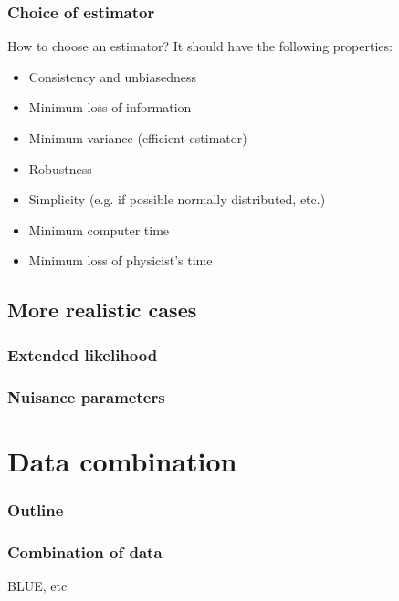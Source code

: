 \documentclass[9pt]{beamer}
\begin{document}
\begin{frame}
 \frametitle{Choice of estimator}
 How to choose an estimator? It should have the following properties:
 
 \begin{itemize}
  \item Consistency and unbiasedness
  \item Minimum loss of information
  \item Minimum variance (efficient estimator)
  \item Robustness
  \item Simplicity (e.g. if possible normally distributed, etc.)
  \item Minimum computer time
  \item Minimum loss of physicist's time
 \end{itemize}

\end{frame}

\subsection{More realistic cases}


\begin{frame}
 \frametitle{Extended likelihood}
\end{frame}

\begin{frame}
 \frametitle{Nuisance parameters}
\end{frame}


\section{Data combination}

\begin{frame}
 \frametitle{Outline}
 
 \tableofcontents[current]
\end{frame}


\begin{frame}
 \frametitle{Combination of data}
 
 BLUE, etc
\end{frame}
\end{document}
